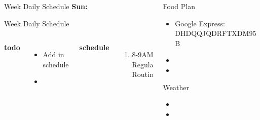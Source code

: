 \documentclass[serif, mathserif, final]{beamer}
\begin{document}
\begin{frame}
\begin{columns}
\begin{column}{0.5\linewidth}
  \begin{block}{Week Daily Schedule} 
    {\bf Sun:} 
  \end{block} 

  \begin{block}{Week Daily Schedule} 
    \begin{columns}
      \textbf{\small todo} \\ 
      \begin{itemize}
        \tiny \item \tiny Add in schedule
      \item \tiny 
      \end{itemize} 
      \textbf{\small schedule} \\
      \begin{enumerate} 
        \tiny \item \tiny 8-9AM: Regular Routines 
      \end{enumerate} 
    \end{columns} 
  \end{block} 
\end{column}

\begin{column}{0.25\linewidth}
  
  \begin{block}{Food Plan} 
    \begin{itemize}
      \tiny \item \tiny Google Express: DHDQQJQDRFTXDM95B
    \item \tiny 
    \item \tiny 
    \end{itemize}
  \end{block} 
  
  \begin{block}{Weather}
    \begin{itemize}
      \tiny \item \tiny 
    \item \tiny
    \end{itemize}
  \end{block}
  

\end{column}
\end{columns}
\end{frame}
\end{document}
